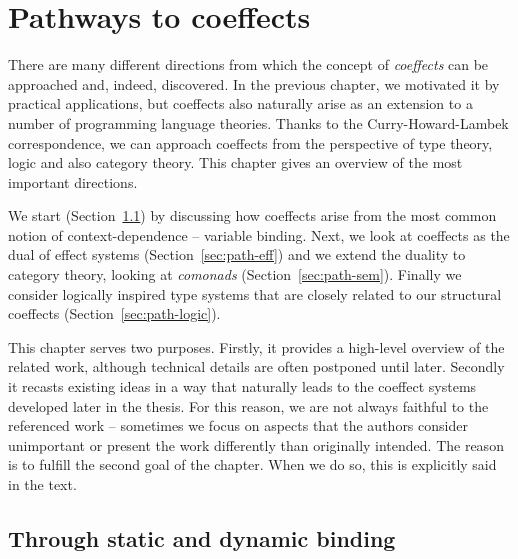 \chapter{Pathways to coeffects}
\label{ch:pathways}

There are many different directions from which the concept of \emph{coeffects} can be approached
and, indeed, discovered. In the previous chapter, we motivated it by practical applications, but
coeffects also naturally arise as an extension to a number of programming language theories.
Thanks to the Curry-Howard-Lambek correspondence, we can approach coeffects from the perspective of
type theory, logic and also category theory. This chapter gives an overview of the most
important directions.

We start (Section~\ref{sec:path-binding}) by discussing how coeffects arise from the most common
notion of context-dependence -- variable binding. Next, we look at coeffects as the dual of effect
systems (Section~\ref{sec:path-eff}) and we extend the duality to category theory, looking at
\emph{comonads} (Section~\ref{sec:path-sem}). Finally we consider logically inspired type systems
that are closely related to our structural coeffects (Section~\ref{sec:path-logic}).

This chapter serves two purposes. Firstly, it provides a high-level overview of the  related work,
although technical details are often postponed until later. Secondly it recasts existing ideas in
a way that naturally leads to the coeffect systems developed later in the thesis. For this reason,
we are not always faithful to the referenced work -- sometimes we focus on aspects that the
authors consider unimportant or present the work differently than originally intended. The reason
is to fulfill the second goal of the chapter. When we do so, this is explicitly said in the text.



%
%

\section{Through static and dynamic binding}
\label{sec:path-binding}

